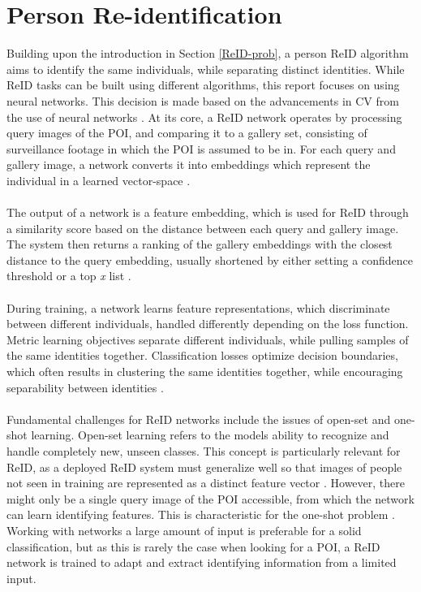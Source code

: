 \section{Person Re-identification}
\label{sec:ReID-tech}
Building upon the introduction in Section \ref{ReID-prob}, a person \acs{ReID} algorithm aims to identify the same individuals, while separating distinct identities. While \acs{ReID} tasks can be built using different algorithms, this report focuses on using neural networks. This decision is made based on the advancements in \acs{CV} from the use of neural networks \cite{NNforCV}. At its core, a \acs{ReID} network operates by processing query images of the \acs{POI}, and comparing it to a gallery set, consisting of surveillance footage in which the \acs{POI} is assumed to be in. For each query and gallery image, a network converts it into embeddings which represent the individual in a learned vector-space \cite{Zheng2016PersonReID}.  
\\\\
The output of a network is a feature embedding, which is used for \acs{ReID} through a similarity score based on the distance between each query and gallery image. The system then returns a ranking of the gallery embeddings with the closest distance to the query embedding, usually shortened by either setting a confidence threshold or a top \textit{x} list \cite{Zheng2016PersonReID}.
\\\\
During training, a network learns feature representations, which discriminate between different individuals, handled differently depending on the loss function. Metric learning objectives separate different individuals, while pulling samples of the same identities together. Classification losses optimize decision boundaries, which often results in clustering the same identities together, while encouraging separability between identities \cite{Zheng2016PersonReID}. 
\\\\
Fundamental challenges for \acs{ReID} networks include the issues of open-set and one-shot learning. Open-set learning refers to the models ability to recognize and handle completely new, unseen classes. This concept is particularly relevant for \acs{ReID}, as a deployed \acs{ReID} system must generalize well so that images of people not seen in training are represented as a distinct feature vector \cite{Liao2014OpenSet}. However, there might only be a single query image of the \acs{POI} accessible, from which the network can learn identifying features. This is characteristic for the one-shot problem \cite{Zheng2015OneShot}. Working with networks a large amount of input is preferable for a solid classification, but as this is rarely the case when looking for a \acs{POI}, a \acs{ReID} network is trained to adapt and extract identifying information from a limited input. 


